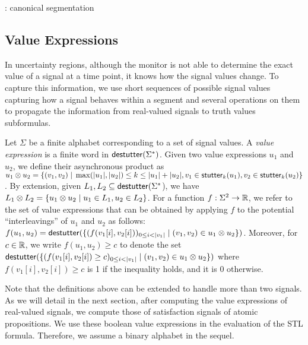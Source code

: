 \begin{example}
	\TODO: canonical segmentation
\end{example}

\subsection{Value Expressions}
In uncertainty regions, although the monitor is not able to determine the exact value of a signal at a time point, it knows how the signal values change.
To capture this information, we use short sequences of possible signal values capturing how a signal behaves within a segment and several operations on them to propagate the information from real-valued signals to truth values subformulas.


Let $\Sigma$ be a finite alphabet corresponding to a set of signal values.
A \emph{value expression} is a finite word in $\mathsf{destutter}(\Sigma^*)$.
Given two value expressions $u_1$ and $u_2$, we define their asynchronous product as $u_1 \otimes u_2 = \{ (v_1,v_2) \st \max(|u_1|, |u_2|) \leq k \leq |u_1| + |u_2|, v_1 \in \stutter_k(u_1), v_2 \in \stutter_k(u_2) \}$.
By extension, given $L_1, L_2 \subseteq \mathsf{destutter}(\Sigma^*$), we have $L_1 \otimes L_2 = \{ u_1 \otimes u_2 \st u_1 \in L_1, u_2 \in L_2 \}$.
For a function $f : \Sigma^2 \to \mathbb{R}$, we refer to the set of value expressions that can be obtained by applying $f$ to the potential ``interleavings'' of $u_1$ and $u_2$ as follows: $f(u_1, u_2) = \destutter(\{(f(v_1[i], v_2[i]))_{0 \leq i < |v_1|} \st (v_1, v_2) \in u_1 \otimes u_2\})$.
Moreover, for $c \in \mathbb{R}$, we write $f(u_1, u_2) \geq c$ to denote the set $\destutter(\{(f(v_1[i], v_2[i]) \geq c)_{0 \leq i < |v_1|} \st (v_1, v_2) \in u_1 \otimes u_2\})$ where $f(v_1[i], v_2[i]) \geq c$ is 1 if the inequality holds, and it is 0 otherwise.

Note that the definitions above can be extended to handle more than two signals.
As we will detail in the next section, after computing the value expressions of real-valued signals, we compute those of satisfaction signals of atomic propositions.
We use these boolean value expressions in the evaluation of the STL formula.
Therefore, we assume a binary alphabet in the sequel.

